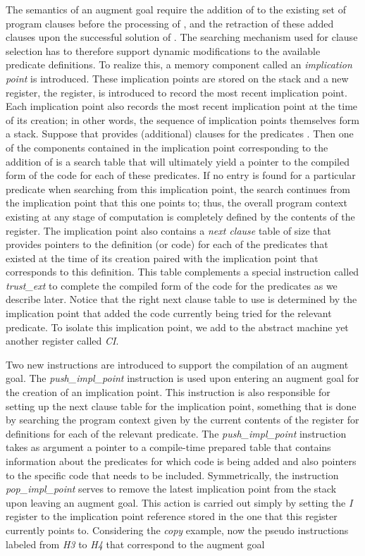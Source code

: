 The semantics of an augment goal  require the addition of 
to the existing set of program clauses before the processing of ,
and the retraction of these added clauses upon the successful
solution of .
The searching mechanism used for clause selection has to therefore
support dynamic modifications to the available predicate definitions.
To realize this, a memory component called an {\it implication point}
is introduced. These implication points are stored on the stack and a
new register, the  register, is introduced to record the most
recent implication point. Each implication point also records the most
recent implication point at the time of its creation; in other words,
the sequence of implication points themselves form a stack. Suppose
that  provides (additional) clauses for the predicates
. Then one of the components contained in the
implication point corresponding to the addition of  is a search
table that will ultimately yield a pointer to the compiled form of the
code for each of these predicates. If no entry is found for a
particular predicate when searching from this implication point, the
search continues from the implication point that this one points to;
thus, the overall program context existing at any stage of computation
is completely defined by the contents of the  register.  The
implication point also contains a {\em next clause} table of size 
that provides pointers to the definition (or code) for each of the
predicates  that existed at the time of its creation
paired with the implication point that corresponds to this
definition. This table complements a special instruction called {\it
  trust\_ext} to complete the compiled form of the code for the
predicates  as we describe later. Notice that the
right next clause table to use is determined by the implication point
that added the code currently being tried for the relevant
predicate. To isolate this implication point, we add to the abstract
machine yet another register called {\it CI}.

Two new instructions are introduced to support the compilation of an
augment goal. The {\it push\_impl\_point} instruction is used upon
entering an augment goal for the creation of an implication
point. This instruction is also responsible for setting up the next
clause table for the implication point, something that is done by
searching the program context given by the current contents of the 
register for definitions for each of the relevant predicate. The {\it
  push\_impl\_point} instruction takes as argument a pointer to a
compile-time prepared table that contains information about the
predicates for which code is being added and also pointers to the
specific code that needs to be included.
Symmetrically, the instruction {\it pop\_impl\_point} serves to remove
the latest implication point from the stack upon leaving an augment
goal. This action is carried out simply by setting the {\it I}
register to the implication point reference stored in the one that
this register currently points to.
Considering the {\it copy} example, now the pseudo instructions labeled from
{\it H3} to {\it H4} that correspond to the augment goal

